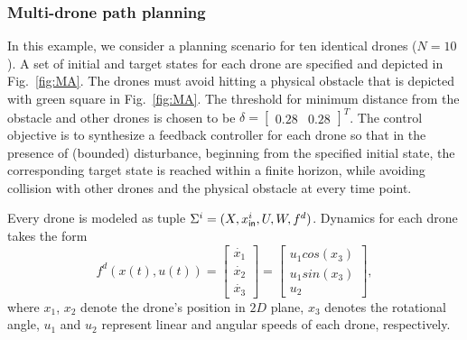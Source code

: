 \subsubsection{Multi-drone path planning}\label{sec:Multirobot}
In this example, we consider a planning scenario for ten identical drones ($N=10$). A set of initial and target states for each drone are specified and depicted in Fig.~\ref{fig:MA}. The drones must avoid hitting a physical obstacle that is depicted with green square in Fig.~\ref{fig:MA}. %
The threshold for minimum distance from the obstacle and other drones is chosen to be $\delta=\begin{bmatrix}0.28&0.28\end{bmatrix}^T$. %
The control objective is to synthesize a feedback controller for each drone so that in the presence of (bounded) disturbance, beginning from the specified initial state, the corresponding target state is reached within a finite horizon, while avoiding collision with other drones and the physical obstacle at every time point. 

Every drone is modeled as tuple $\Sigma^i=(X,x_{\mathsf{in}}^i,U,W,f^d)$. %
Dynamics for each drone takes the form
\begin{equation*}\label{eq:unicycle_ss}
	f^{d}(x(t),u(t))=
	\begin{bmatrix}
		\dot{x_1}\\
		\dot{x_2}\\
		\dot{x_3}
	\end{bmatrix}=
	\begin{bmatrix}
		u_1cos(x_3)\\
		u_1sin(x_3)\\
		u_2
	\end{bmatrix},
\end{equation*}
where $x_1$, $x_2$ denote the drone's position in $2D$ plane, $x_3$ denotes the rotational angle, $u_1$ and $u_2$ represent linear and angular speeds of each drone, respectively. %


